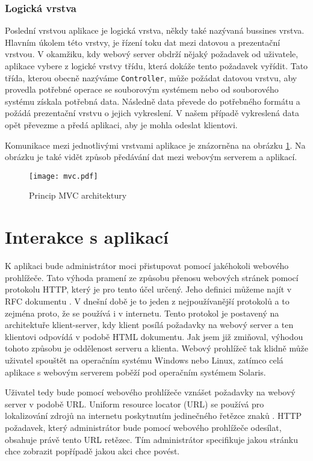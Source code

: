         \subsubsection{Logická vrstva}
        Poslední vrstvou aplikace je logická vrstva, někdy také nazývaná bussines vrstva. Hlavním úkolem této vrstvy, je řízení toku dat mezi datovou a prezentační vrstvou. V okamžiku, kdy webový server obdrží nějaký požadavek od uživatele, aplikace vybere z logické vrstvy třídu, která dokáže tento požadavek vyřídit. Tato třída, kterou obecně nazýváme \verb|Controller|, může požádat datovou vrstvu, aby provedla potřebné operace se souborovým systémem nebo od souborového systému získala potřebná data. Následně data převede do potřebného formátu a požádá prezentační vrstvu o jejich vykreslení. V našem případě vykreslená data opět převezme a předá aplikaci, aby je mohla odeslat klientovi.

        Komunikace mezi jednotlivými vrstvami aplikace je znázorněna na obrázku \ref{mvc}. Na obrázku je také vidět způsob předávání dat mezi webovým serverem a aplikací.

    \begin{figure}[h]
        \caption{Princip MVC architektury}
        \label{mvc}
        \centering
        \texttt{[image: mvc.pdf]}
    \end{figure}
\section{Interakce s aplikací}
K aplikaci bude administrátor moci přistupovat pomocí jakéhokoli webového prohlížeče. Tato výhoda pramení ze způsobu přenosu webových stránek pomocí protokolu HTTP, který je pro tento účel určený. Jeho definici můžeme najít v RFC dokumentu \cite{RFC2616}. V dnešní době je to jeden z nejpoužívanější protokolů a to zejména proto, že se používá i v internetu. Tento protokol je postavený na architektuře klient-server, kdy klient posílá požadavky na webový server a ten klientovi odpovídá v podobě HTML dokumentu. Jak jsem již zmiňoval, výhodou tohoto způsobu je oddělenost serveru a klienta. Webový prohlížeč tak klidně může uživatel spouštět na operačním systému Windows nebo Linux, zatímco celá aplikace s webovým serverem poběží pod operačním systémem Solaris.

Uživatel tedy bude pomocí webového prohlížeče vznášet požadavky na webový server v podobě URL. Uniform resource locator (URL) se používá pro lokalizování zdrojů na internetu poskytnutím jedinečného řetězce znaků \cite{RFC3986}. HTTP požadavek, který administrátor bude pomocí webového prohlížeče odesílat, obsahuje právě tento URL retězec. Tím administrátor specifikuje jakou stránku chce zobrazit popřípadě jakou akci chce povést.

